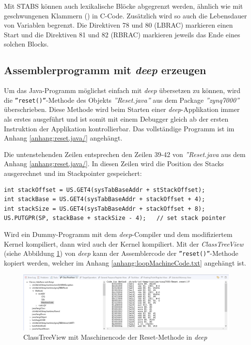 Mit STABS können auch lexikalische Blöcke abgegrenzt werden, ähnlich wie mit geschwungenen Klammern ({}) in C-Code.
Zusätzlich wird so auch die Lebensdauer von Variablen begrenzt.
Die Direktiven 78 und 80 (LBRAC) markieren einen Start und die Direktiven 81 und 82 (RBRAC) markieren jeweils das Ende eines solchen Blocks.


\subsection{Assemblerprogramm mit \textit{deep} erzeugen}
Um das Java-Programm möglichst einfach mit \textit{deep} übersetzen zu können, wird die \texttt{''reset()''}-Methode des Objekts \textit{''Reset.java''} aus dem Package \textit{''zynq7000''} überschrieben.
Diese Methode wird beim Starten einer \textit{deep}-Applikation immer als erstes ausgeführt und ist somit mit einem Debugger gleich ab der ersten Instruktion der Applikation kontrollierbar.
Das vollständige Programm ist im Anhang \ref{anhang:reset.java/} angehängt.

Die untenstehenden Zeilen entsprechen den Zeilen 39-42 von \textit{''Reset.java} aus dem Anhang \ref{anhang:reset.java/}.
In diesen Zeilen wird die Position des Stacks ausgerechnet und im Stackpointer gespeichert:
\lstset{language=java}
\begin{lstlisting}
int stackOffset = US.GET4(sysTabBaseAddr + stStackOffset);
int stackBase = US.GET4(sysTabBaseAddr + stackOffset + 4);
int stackSize = US.GET4(sysTabBaseAddr + stackOffset + 8);
US.PUTGPR(SP, stackBase + stackSize - 4);	// set stack pointer
\end{lstlisting}

Wird ein Dummy-Programm mit dem \textit{deep}-Compiler und dem modifiziertem Kernel kompiliert, dann wird auch der Kernel kompiliert.
Mit der \textit{ClassTreeView} (siehe Abbildung \ref{fig:MaschineCode.ClassTreeView.Deep}) von \textit{deep} kann der Assemblercode der \texttt{''reset()''}-Methode kopiert werden, welcher im Anhang \ref{anhang:loopMachineCode.txt} angehängt ist.

\begin{figure}[htbp]
	\centering
		\includegraphics[width=\textwidth,height=\textheight,keepaspectratio]{images/MaschineCode_ClassTreeView_Deep.PNG}
	\caption[]{ClassTreeView mit Maschinencode der Reset-Methode in \textit{deep}}
	\label{fig:MaschineCode.ClassTreeView.Deep}
\end{figure}


